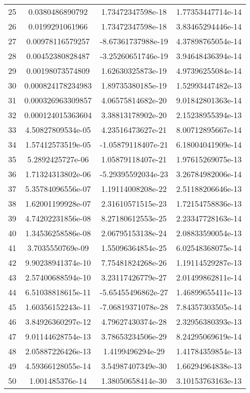 \documentclass[10pt]{article}
\begin{document}
\begin{table}[H]
\begin{tabular}{c c c c}
25 & 0.0380486890792 & 1.73472347598e-18 & 1.77353447714e-14 \\
26 & 0.0199291061966 & 1.73472347598e-18 & 3.83465294446e-14 \\
27 & 0.00978116579257 & -8.67361737988e-19 & 4.37898765054e-14 \\
28 & 0.00452380828487 & -3.25260651746e-19 & 3.94648436394e-14 \\
29 & 0.00198073574809 & 1.62630325873e-19 & 4.97396255084e-14 \\
30 & 0.000824178234983 & 1.89735380185e-19 & 1.52993447482e-13 \\
31 & 0.000326963309857 & 4.06575814682e-20 & 9.01842801363e-14 \\
32 & 0.000124015363604 & 3.38813178902e-20 & 2.15238955394e-13 \\
33 & 4.50827809534e-05 & 4.23516473627e-21 & 8.00712895667e-14 \\
34 & 1.57412573519e-05 & -1.05879118407e-21 & 6.18004041909e-14 \\
35 & 5.2892425727e-06 & 1.05879118407e-21 & 1.97615269075e-13 \\
36 & 1.71324313802e-06 & -5.29395592034e-23 & 3.26784982006e-14 \\
37 & 5.35784096556e-07 & 1.19114008208e-22 & 2.51188206646e-13 \\
38 & 1.62001199928e-07 & 2.31610571515e-23 & 1.72154758836e-13 \\
39 & 4.74202231856e-08 & 8.27180612553e-25 & 2.23347728163e-14 \\
40 & 1.34536258586e-08 & 2.06795153138e-24 & 2.08833590054e-13 \\
41 & 3.7035550769e-09 & 1.55096364854e-25 & 6.02548368075e-14 \\
42 & 9.90238941374e-10 & 7.75481824268e-26 & 1.19114529287e-13 \\
43 & 2.57400688594e-10 & 3.23117426779e-27 & 2.01499862811e-14 \\
44 & 6.51038818615e-11 & -5.65455496862e-27 & 1.46899655411e-13 \\
45 & 1.60356152243e-11 & -7.06819371078e-28 & 7.84357303505e-14 \\
46 & 3.84926360297e-12 & 4.79627430374e-28 & 2.32956380393e-13 \\
47 & 9.01144628754e-13 & 3.78653234506e-29 & 8.24295069619e-14 \\
48 & 2.05887226426e-13 & 1.4199496294e-29 & 1.41784359854e-13 \\
49 & 4.59366128055e-14 & 3.54987407349e-30 & 1.66294964838e-13 \\
50 & 1.001485376e-14 & 1.38050658414e-30 & 3.10153763163e-13 \\
\hline %
\end{tabular} 
\end{table} 
\end{document}
